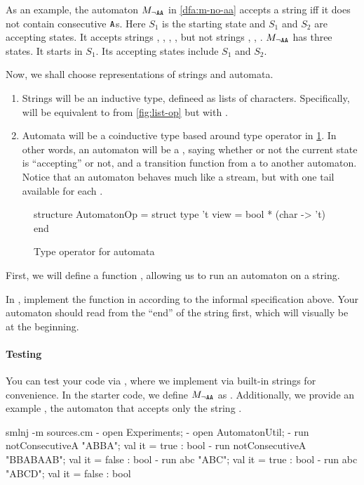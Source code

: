 \documentclass[11pt]{article}
\begin{document}
As an example, the automaton $M_{\lnot\mathtt{AA}}$ in \cref{dfa:m-no-aa} accepts a string iff it does not contain consecutive $\mathtt{A}$s.
Here $S_1$ is the starting state and $S_1$ and $S_2$ are accepting states.
It accepts strings , , , , but not strings , , .
$M_{\lnot\mathtt{AA}}$ has three states.
It starts in $S_1$. Its accepting states include $S_1$ and $S_2$.

Now, we shall choose representations of strings and automata.
\begin{enumerate}
  \item
    Strings will be an inductive type, defineed as lists of characters.
    Specifically,  will be equivalent to  from \cref{fig:list-op} but with .
  \item
    Automata will be a coinductive type based around type operator  in \cref{fig:automaton-op}.
    In other words, an automaton will be a , saying whether or not the current state is ``accepting'' or not, and a transition function from a  to another automaton.
    Notice that an automaton behaves much like a stream, but with one tail available for each .
\end{enumerate}

\begin{figure}[h]
  \begin{codeblock}
  structure AutomatonOp =
    struct
      type 't view = bool * (char -> 't)
    end
  \end{codeblock}
  \caption{Type operator for automata}
  \label{fig:automaton-op}
\end{figure}

First, we will define a function , allowing us to run an automaton on a string.

\begin{task}{15}
  In , implement the  function in  according to the informal specification above.
  Your automaton should read from the ``end'' of the string first, which will visually be at the beginning.
\end{task}

\paragraph{Testing}
You can test your code via , where we implement  via built-in strings for convenience.
In the starter code, we define $M_{\lnot\mathtt{AA}}$ as .
Additionally, we provide an example , the automaton that accepts only the string .
\begin{codeblock}
  smlnj -m sources.cm
  - open Experiments;
  - open AutomatonUtil;
  - run notConsecutiveA "ABBA";
  val it = true : bool
  - run notConsecutiveA "BBABAAB";
  val it = false : bool
  - run abc "ABC";
  val it = true : bool
  - run abc "ABCD";
  val it = false : bool
\end{codeblock}
\end{document}
